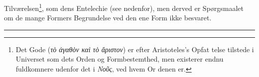 \documentclass[12pt,a4paper]{book}
\newcommand{\divrule}{\begin{center}\rule{2cm}{0.4pt}\end{center}}
\newcommand{\gk}[1]{\textit{#1}}
\begin{document}
Tilværelsen\footnote{Det Gode (\gk{τὸ ἀγαθὸν καὶ τὸ ἄριστον}) er efter Aristoteles's Opfat\-%
telse tilstede i Universet som dets Orden og Formbestemthed, men
existerer endnu fuldkomnere udenfor det i \gk{Νοῦς}, ved hvem Or\-%
denen er.}, som dens Entelechie (see nedenfor), men derved
er Spørgsmaalet om de mange Formers Begrundelse ved den
ene Form ikke besvaret.

\divrule
\end{document}

